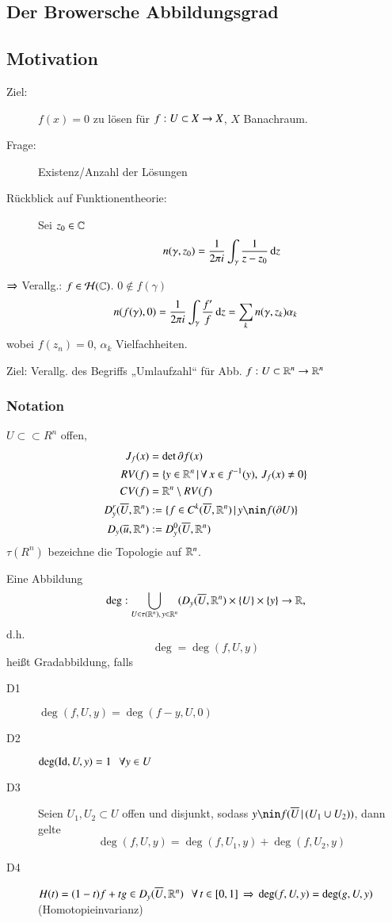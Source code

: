 \subsection{Der Browersche Abbildungsgrad}

\subsection*{Motivation}
\begin{description}
    \item[Ziel:]
    $f(x)=0$ zu lösen für $f:U\subset X \rightarrow X$, $X$ Banachraum.
    \item[Frage:]
    Existenz/Anzahl der Lösungen
    \item[Rückblick auf Funktionentheorie:]
    Sei $z_0\in \mathbb{C}$
    \[
        n(\gamma,z_0) = \frac{1}{2\pi i} \int_\gamma \frac1{z-z_0} \, \mathrm{d} z
    \]
\end{description}
$\Rightarrow$ Verallg.: $f\in \mathcal H(\mathbb{C})$. $0\nin f(\gamma)$
\[
    n(f(\gamma),0)=\frac1{2\pi i} \int_\gamma \frac{f'}{f} \, \mathrm{d} z = \sum_k n(\gamma,z_k) \alpha_k
\]
wobei $f(z_n)=0$, $\alpha_k$ Vielfachheiten.

\noindent Ziel: Verallg. des Begriffs „Umlaufzahl“ für Abb. $f:U\subset \mathbb{R}^n\rightarrow \mathbb{R}^n$

\subsubsection{Notation}

$U\subset\subset R^n$ offen,
\begin{align*}
    J_f(x)&=\det \partial f(x)\\
    RV(f)&=\{ y\in \R^n \,| \, \forall \, x\in f^{-1}(y), \, J_f(x)\neq 0 \}\\
    CV(f)&= \R^n \setminus RV(f)\\
    D_y^r(\ol U, \R^n)&:=\{f\in C^k(\ol U, \R^n)\,|\,y\nin f(\partial U)\}\\
    D_y(\ol u, \R^n)&:=D_y^0(\ol U, \R^n)
\end{align*}
$\tau(R^n)$ bezeichne die Topologie auf $\mathbb{R}^n$.
\begin{defi}
    Eine Abbildung
    \[
        \deg: \bigcup_{U\in \tau(\mathbb{R}^n),\, y\in \mathbb{R}^n} (D_y(\overline U, \mathbb{R}^n)\times \{U\}\times \{y\}\rightarrow \mathbb{R},
    \]
    d.h.
    \[
        \deg=\deg(f,U,y) 
    \]
    heißt Gradabbildung, falls
    \begin{description}
        \item[D1]
        $\deg(f,U,y)=\deg(f-y,U,0)$
        \item[D2]
        $\deg(\mathrm{Id},U,y)=1 \hspace{.25cm} \forall y\in U$
        \item[D3]
        Seien $U_1,U_2\subset U$ offen und disjunkt, sodass $y\nin f(\ol U\,|\,(U_1\cup U_2))$, dann
        gelte
        \[
            \deg(f,U,y)=\deg(f,U_1,y)+\deg(f,U_2,y)
        \]
        \item[D4]
        $H(t)=(1-t)f+tg \in D_y(\overline U,\mathbb{R}^n) \hspace{.25cm} \forall \, t\in [0,1]\, \Rightarrow \, \deg(f,U,y)=\deg(g,U,y)$
        (Homotopieinvarianz)
\end{description}
\end{defi}

